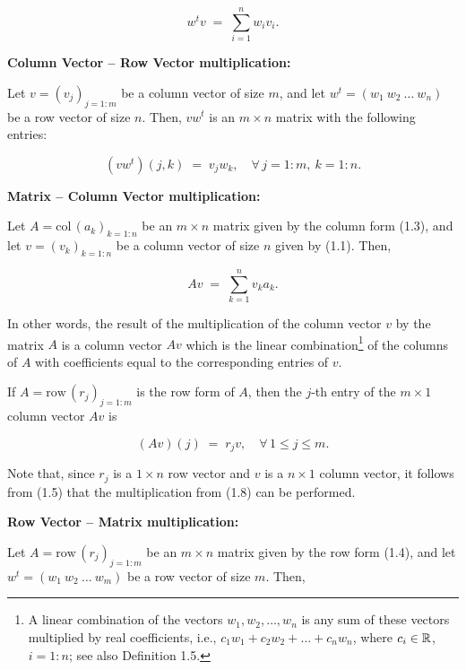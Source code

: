 \begin{equation}
w^t v \;=\; \sum_{i=1}^n w_i v_i.
\end{equation}

\medskip\noindent\textbf{Column Vector -- Row Vector multiplication:}\par
Let $v=(v_j)_{j=1:m}$ be a column vector of size $m$, and let
$w^t=(w_1\ w_2\ \ldots\ w_n)$ be a row vector of size $n$. Then, $vw^t$ is an
$m\times n$ matrix with the following entries:

\begin{equation}
(vw^t)(j,k) \;=\; v_j w_k, \quad \forall\, j=1:m,\ k=1:n.
\end{equation}

\medskip\noindent\textbf{Matrix -- Column Vector multiplication:}\par
Let $A=\mathrm{col}\,(a_k)_{k=1:n}$ be an $m\times n$ matrix given by the
column form (1.3), and let $v=(v_k)_{k=1:n}$ be a column vector of size $n$
given by (1.1). Then,

\begin{equation}
Av \;=\; \sum_{k=1}^n v_k a_k.
\end{equation}

In other words, the result of the multiplication of the column vector $v$ by
the matrix $A$ is a column vector $Av$ which is the linear
combination\footnote{A linear combination of the vectors
$w_1,w_2,\ldots,w_n$ is any sum of these vectors multiplied by real
coefficients, i.e., $c_1w_1+c_2w_2+\ldots+c_nw_n$, where $c_i\in\mathbb{R}$,
$i=1:n$; see also Definition 1.5.} of the columns of $A$ with coefficients
equal to the corresponding entries of $v$.

If $A=\mathrm{row}\,(r_j)_{j=1:m}$ is the row form of $A$, then the $j$-th
entry of the $m\times 1$ column vector $Av$ is

\begin{equation}
(Av)(j) \;=\; r_j v, \quad \forall\, 1\le j \le m.
\end{equation}

Note that, since $r_j$ is a $1\times n$ row vector and $v$ is a $n\times 1$
column vector, it follows from (1.5) that the multiplication from (1.8) can
be performed.

\medskip\noindent\textbf{Row Vector -- Matrix multiplication:}\par
Let $A=\mathrm{row}\,(r_j)_{j=1:m}$ be an $m\times n$ matrix given by the
row form (1.4), and let $w^t=(w_1\ w_2\ \ldots\ w_m)$ be a row vector of
size $m$. Then,

